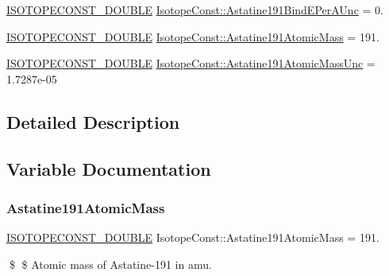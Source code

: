 \begin{DoxyCompactItemize}
\mbox{\hyperlink{group___isotope_const-_macros_ga8f45a7272ce02c0b4c65c44636ed719a}{I\+S\+O\+T\+O\+P\+E\+C\+O\+N\+S\+T\+\_\+\+D\+O\+U\+B\+LE}} \mbox{\hyperlink{group___isotope_const-_astatine-_at191_ga8205d99b1f5570d8992b955c34a6d73f}{Isotope\+Const\+::\+Astatine191\+Bind\+E\+Per\+A\+Unc}} = 0.
\item 
\mbox{\hyperlink{group___isotope_const-_macros_ga8f45a7272ce02c0b4c65c44636ed719a}{I\+S\+O\+T\+O\+P\+E\+C\+O\+N\+S\+T\+\_\+\+D\+O\+U\+B\+LE}} \mbox{\hyperlink{group___isotope_const-_astatine-_at191_gadc238c78e2788db90c336136d26143f6}{Isotope\+Const\+::\+Astatine191\+Atomic\+Mass}} = 191.
\item 
\mbox{\hyperlink{group___isotope_const-_macros_ga8f45a7272ce02c0b4c65c44636ed719a}{I\+S\+O\+T\+O\+P\+E\+C\+O\+N\+S\+T\+\_\+\+D\+O\+U\+B\+LE}} \mbox{\hyperlink{group___isotope_const-_astatine-_at191_gaf171c9b7b44c51ca7aa60fc6f4df2e04}{Isotope\+Const\+::\+Astatine191\+Atomic\+Mass\+Unc}} = 1.\+7287e-\/05
\end{DoxyCompactItemize}


\subsection{Detailed Description}


\subsection{Variable Documentation}
\mbox{\label{group___isotope_const-_astatine-_at191_gadc238c78e2788db90c336136d26143f6}} 
\subsubsection{\texorpdfstring{Astatine191\+Atomic\+Mass}{Astatine191AtomicMass}}
{\footnotesize\ttfamily \mbox{\hyperlink{group___isotope_const-_macros_ga8f45a7272ce02c0b4c65c44636ed719a}{I\+S\+O\+T\+O\+P\+E\+C\+O\+N\+S\+T\+\_\+\+D\+O\+U\+B\+LE}} Isotope\+Const\+::\+Astatine191\+Atomic\+Mass = 191.}

\$ \$ Atomic mass of Astatine-\/191 in amu. \mbox{\label{group___isotope_const-_astatine-_at191_gaf171c9b7b44c51ca7aa60fc6f4df2e04}} 
